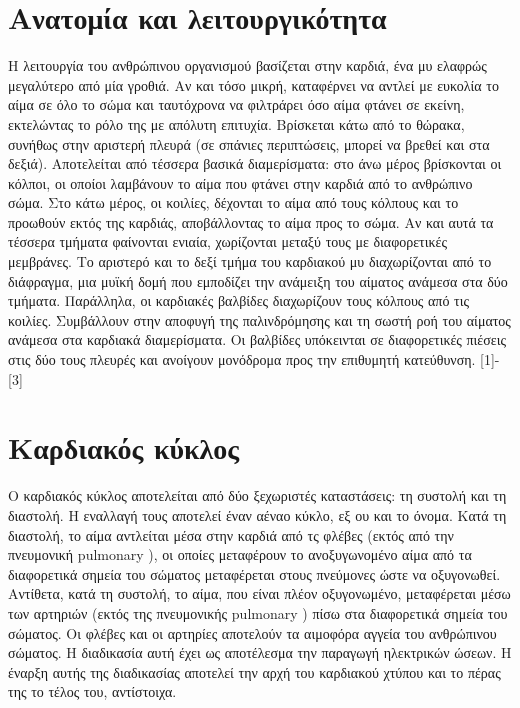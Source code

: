 \documentclass{report}
\newcommand \en {\selectlanguage{english}}
\newcommand \gr {\selectlanguage{greek}}
\begin{document}
	\section{Ανατομία και λειτουργικότητα}
	Η λειτουργία του ανθρώπινου οργανισμού βασίζεται στην καρδιά, ένα μυ ελαφρώς μεγαλύτερο από μία γροθιά. Αν και τόσο μικρή, καταφέρνει να αντλεί με ευκολία το αίμα σε όλο το σώμα και ταυτόχρονα να φιλτράρει όσο αίμα φτάνει σε εκείνη, εκτελώντας το ρόλο της με απόλυτη επιτυχία. Βρίσκεται κάτω από το θώρακα, συνήθως στην αριστερή πλευρά (σε σπάνιες περιπτώσεις, μπορεί να βρεθεί και στα δεξιά). Αποτελείται από τέσσερα βασικά διαμερίσματα: στο άνω μέρος βρίσκονται οι κόλποι, οι οποίοι λαμβάνουν το αίμα που φτάνει στην καρδιά από το ανθρώπινο σώμα. Στο κάτω μέρος, οι κοιλίες, δέχονται το αίμα από τους κόλπους και το προωθούν εκτός της καρδιάς, αποβάλλοντας το αίμα προς το σώμα. Αν και αυτά τα τέσσερα τμήματα φαίνονται ενιαία, χωρίζονται μεταξύ τους με διαφορετικές μεμβράνες. Το αριστερό και το δεξί τμήμα του καρδιακού μυ διαχωρίζονται από το διάφραγμα, μια μυϊκή δομή που εμποδίζει την ανάμειξη του αίματος ανάμεσα στα δύο τμήματα. Παράλληλα, οι καρδιακές βαλβίδες διαχωρίζουν τους κόλπους από τις κοιλίες. Συμβάλλουν στην αποφυγή της παλινδρόμησης και τη σωστή ροή του αίματος ανάμεσα στα καρδιακά διαμερίσματα. Οι βαλβίδες υπόκεινται σε διαφορετικές πιέσεις στις δύο τους πλευρές και ανοίγουν μονόδρομα προς την επιθυμητή κατεύθυνση. [1]-[3]
	
	\section{Καρδιακός κύκλος}
	Ο καρδιακός κύκλος αποτελείται από δύο ξεχωριστές καταστάσεις: τη συστολή και τη διαστολή. Η εναλλαγή τους αποτελεί έναν αέναο κύκλο, εξ ου και το όνομα. Κατά τη διαστολή, το αίμα αντλείται μέσα στην καρδιά από τς φλέβες (εκτός από την πνευμονική \en pulmonary \gr), οι οποίες μεταφέρουν το ανοξυγωνομένο αίμα από τα διαφορετικά σημεία του σώματος μεταφέρεται στους πνεύμονες ώστε να οξυγονωθεί. 
	Αντίθετα, κατά τη συστολή, το αίμα, που είναι πλέον οξυγονωμένο, μεταφέρεται μέσω των αρτηριών (εκτός της πνευμονικής \en pulmonary \gr) πίσω στα διαφορετικά σημεία του σώματος. Οι φλέβες και οι αρτηρίες αποτελούν τα αιμοφόρα αγγεία του ανθρώπινου σώματος. Η διαδικασία αυτή έχει ως αποτέλεσμα την παραγωγή ηλεκτρικών ώσεων. Η έναρξη αυτής της διαδικασίας αποτελεί την αρχή του καρδιακού χτύπου και το πέρας της το τέλος του, αντίστοιχα. 
\end{document}
